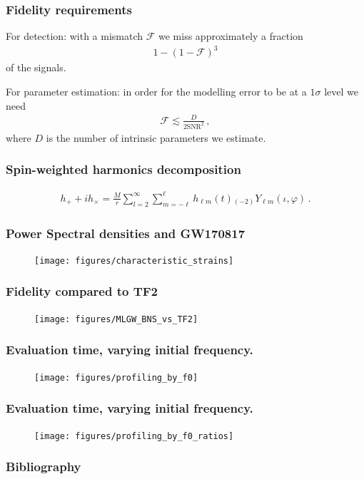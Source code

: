 \documentclass{beamer}
\begin{document}
\begin{frame}
    \frametitle{Fidelity requirements}
    For detection: with a mismatch \(\mathcal{F}\) we miss approximately a fraction 
    \begin{align}
    1 - (1 - \mathcal{F})^3
    \end{align}
    of the signals. 
    
    For parameter estimation: in order for the modelling error to be at a \(1 \sigma \) level we need 
    \begin{align}
    \mathcal{F} \lesssim \frac{D}{2 \text{SNR}^2}
    \,,
    \end{align}
    where \(D\) is the number of intrinsic parameters we estimate.
\end{frame}

\begin{frame}
    \frametitle{Spin-weighted harmonics decomposition}
    \begin{align}
    h_+ + i h_\times = \frac{M}{r} \sum _{l=2}^{\infty } \sum _{m=-\ell}^{\ell} h_{\ell m} (t) {}_{(-2)}Y_{\ell m} (\iota, \varphi )
    \,.
    \end{align}
\end{frame}

\begin{frame}
    \frametitle{Power Spectral densities and GW170817}
    \begin{figure}[ht]
    \centering
    \vspace*{-.25cm}
    \texttt{[image: figures/characteristic\_strains]}
    \label{fig:characteristic_strains}
    \end{figure}
\end{frame}

\begin{frame}
    \frametitle{Fidelity compared to TF2}
    \begin{figure}[ht]
    \centering
    \texttt{[image: figures/MLGW\_BNS\_vs\_TF2]}
    \label{fig:MLGW_BNS_vs_TF2}
    \end{figure}
\end{frame}

\begin{frame}
    \frametitle{Evaluation time, varying initial frequency.}    
    \begin{figure}[ht]
    \centering
    \texttt{[image: figures/profiling\_by\_f0]}
    \label{fig:profiling_by_f0}
    \end{figure}
\end{frame}

\begin{frame}
    \frametitle{Evaluation time, varying initial frequency.}    
    \begin{figure}[ht]
    \centering
    \texttt{[image: figures/profiling\_by\_f0\_ratios]}
    \label{fig:profiling_by_f0_ratios}
    \end{figure}
\end{frame}

\begin{frame}
    \frametitle{Bibliography}
    \printbibliography
\end{frame}
\end{document}
